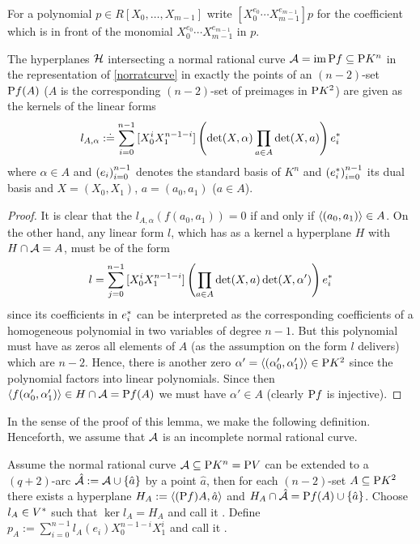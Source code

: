 \begin{notation}
    For a polynomial $p\in R[X_0,\ldots,X_{m-1}]$ write $[X_0^{e_0}\cdots X_{m-1}^{e_{m-1}}]p$ for the coefficient which is in front of the monomial $X_0^{e_0}\cdots X_{m-1}^{e_{m-1}}$ in $p$.
\end{notation}

\begin{lemma}\label{norrattandesc}
    The hyperplanes $\mathcal{H}$ intersecting a normal rational curve $\mathcal{A}=\mathop\mathrm{im}\mathrm{P}{f}\subseteq \mathrm{P}{K^n}$ in the representation of \autoref{norratcurve} in exactly the points of an $(n-2)$-set $\mathrm{P}{f}(A)$ ($A$ is the corresponding $(n-2)$-set of preimages in $\P K^2$) are given as the kernels of the linear forms 
    $$
    l_{A,\alpha}:\doteq\sum_{i=0}^{n-1}{[X_0^i X_1^{n-1-i}]\left(\det(X,\alpha)\prod_{a\in A}{\det(X,a)}\right){e}^{\ast}_i}
    $$
    where $\alpha\in A$ and $\seq{e_i}_{i=0}^{n-1}$ denotes the standard basis of $K^n$ and $\seq{\dual e_i}_{i=0}^{n-1}$ its dual basis and $X=(X_0,X_1)$, $a=(a_0,a_1)$ ($a\in A$).  
\end{lemma}

\begin{proof}
    It is clear that the $l_{A,\alpha}(f(a_0,a_1))=0$ if and only if $\gen{(a_0,a_1)}\in A$. On the other hand, any linear form $l$, which has as a kernel a hyperplane $H$ with $H\cap\mathcal{A}=A$, must be of the form
    $$
    l=\sum_{j=0}^{n-1}{[X_0^i X_1^{n-1-i}]\left(\prod_{a\in A}{\det(X,a)}\det(X,\alpha')\right){e}^{\ast}_i}
    $$
    since its coefficients in ${e}^{\ast}_i$ can be interpreted as the corresponding coefficients of a homogeneous polynomial in two variables of degree $n-1$. But this polynomial must have as zeros all elements of $A$ (as the assumption on the form $l$ delivers) which are $n-2$. Hence, there is another zero $\alpha'=\gen{(\alpha'_0,\alpha'_1)}\in\P K^2$ since the polynomial factors into linear polynomials. Since then $\gen{f(\alpha'_0,\alpha'_1)}\in H\setmeet\cA=\proj f(A)$ we must have $\alpha'\in A$ (clearly $\mathrm{P} f$ is injective).    
\end{proof}
In the sense of the proof of this lemma, we make the following definition.
Henceforth, we assume that $\mathcal{A}$ is an incomplete normal rational curve.

\begin{definition}
    Assume the normal rational curve $\mathcal{A}\subseteq \mathrm{P}{K^n}=\mathrm{P}{V}$ can be extended to a $(q+2)$-arc $\hat{\cA}:=\cA\setjoin\set{\hat{a}}$ by a point $\hat a$, then for each $(n-2)$-set $A\subseteq\mathrm{P}{K^2}$ there exists a hyperplane $H_A:=\gen{(\proj f)A,\hat{a}}$ and $H_A\setmeet \hat{\cA}=\proj f(A)\setjoin\set{\hat{a}}$. Choose $l_A\in{V}^{\ast}$ such that $\ker{l_A}=H_A$ and call it .
    Define $p_A:=\sum_{i=0}^{n-1}{l_A(e_i)X_0^{n-1-i}X_1^i}$ and call it .
\end{definition}


